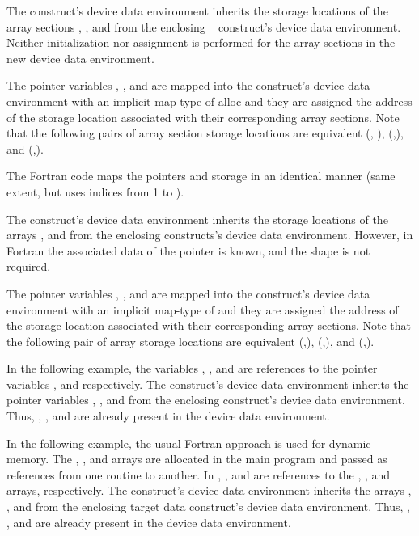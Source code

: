 The  construct's device data environment inherits the storage locations 
of the array sections , , and  from the enclosing ~
construct's device data environment. Neither initialization nor assignment is performed 
for the array sections in the new device data environment.

The pointer variables , , and  are mapped into the  construct's device 
data environment with an implicit map-type of alloc and they are assigned the address 
of the storage location associated with their corresponding array sections. Note 
that the following pairs of array section storage locations are equivalent (, 
), (,), and (,).


The Fortran code maps the pointers and storage in an identical manner (same extent, 
but uses indices from 1 to ).

The  construct's device data environment inherits the storage locations 
of the arrays ,  and  from the enclosing   constructs's 
device data environment. However, in Fortran the associated data of the pointer 
is known, and the shape is not required.

The pointer variables , , and  are mapped into the  construct's 
device data environment with an implicit map-type of  and they are 
assigned the address of the storage location associated with their corresponding 
array sections. Note that the following pair of array storage locations are equivalent 
(,), (,), and (,).



In the following example, the variables , , and  are references to the pointer 
variables ,  and  respectively. The  construct's device data 
environment inherits the pointer variables , , and  from the enclosing  
 construct's device data environment. Thus, , , and  are already 
present in the device data environment.


In the following example, the usual Fortran approach is used for dynamic memory. 
The , , and  arrays are allocated in the main program and passed as references 
from one routine to another. In , ,  and  are references to the 
, , and  arrays, respectively. The  construct's device data 
environment inherits the arrays , , and  from the enclosing target data construct's 
device data environment. Thus, , , and  are already present in the device 
data environment.

